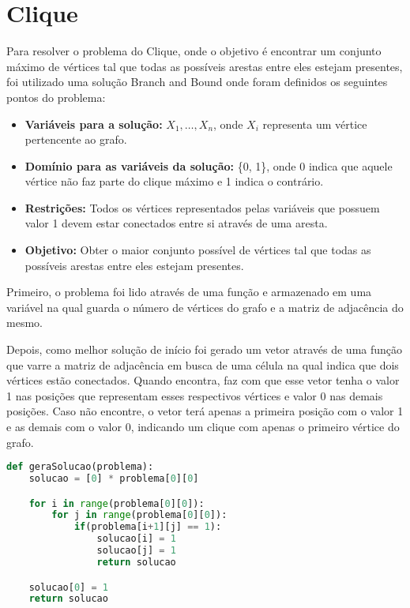 \documentclass[12pt]{article}
\begin{document}
\clearpage

\section{Clique}
    Para resolver o problema do Clique, onde o objetivo é encontrar um conjunto máximo de vértices tal que todas as possíveis arestas entre eles estejam presentes, foi utilizado uma solução Branch and Bound onde foram definidos os seguintes pontos do problema:
    \begin{itemize}
        \item \textbf{Variáveis para a solução:} \(X_1, \dots, X_n\), onde \(X_i\) representa um vértice pertencente ao grafo.
        \item \textbf{Domínio para as variáveis da solução:} \{0, 1\}, onde 0 indica que aquele vértice não faz parte do clique máximo e 1 indica o contrário.
        \item \textbf{Restrições:} Todos os vértices representados pelas variáveis que possuem valor 1 devem estar conectados entre si através de uma aresta.
        \item \textbf{Objetivo:} Obter o maior conjunto possível de vértices tal que todas as possíveis arestas entre eles estejam presentes.
    \end{itemize}

    \par Primeiro, o problema foi lido através de uma função e armazenado em uma variável na qual guarda o número de vértices do grafo e a matriz de adjacência do mesmo. 
    
    \par Depois, como melhor solução de início foi gerado um vetor através de uma função que varre a matriz de adjacência em busca de uma célula na qual indica que dois vértices estão conectados. Quando encontra, faz com que esse vetor tenha o valor 1 nas posições que representam esses respectivos vértices e valor 0 nas demais posições. Caso não encontre, o vetor terá apenas a primeira posição com o valor 1 e as demais com o valor 0, indicando um clique com apenas o primeiro vértice do grafo.
\begin{lstlisting}[caption={Função que gera a melhor solução inicialmente},label={lst:codClique1},language=Python]
def geraSolucao(problema):
    solucao = [0] * problema[0][0]

    for i in range(problema[0][0]):
        for j in range(problema[0][0]):
            if(problema[i+1][j] == 1):
                solucao[i] = 1
                solucao[j] = 1
                return solucao

    solucao[0] = 1
    return solucao
 \end{lstlisting}
\end{document}
